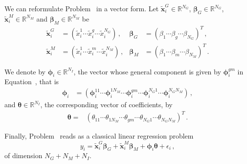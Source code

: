\documentclass[]{book}
\begin{document}
We can reformulate Problem~ in a vector form. Let
\(\tilde{\mathbf{x}}_{i}^{\mathit{G}} \in \mathbb{R}^{N_{\mathit{G}}}\), \(\boldsymbol{\beta}_{\mathit{G}} \in \mathbb{R}^{N_{\mathit{G}}}\),
\(\tilde{\mathbf{x}}_{i}^{\mathit{M}} \in \mathbb{R}^{N_{\mathit{M}}}\) and \(\boldsymbol{\beta}_{\mathit{M}} \in \mathbb{R}^{N_{\mathit{M}}}\)
be \[\begin{aligned}
  \tilde{\mathbf{x}}_{i}^{\mathit{G}} & = (\tilde{x}_i^1 \cdots \tilde{x}_i^g \cdots
                   \tilde{x}_i^{N_{\mathit{G}}})\,,
  &  \boldsymbol{\beta}_{\mathit{G}} & = (\beta_{1} \cdots \beta_{g}
                    \cdots \beta_{N_{\mathit{G}}})^{T}\,,\\
  \tilde{\mathbf{x}}_{i}^{\mathit{M}} & = (\tilde{x}_i^1 \cdots \tilde{x}_i^m \cdots
                   \tilde{x}_i^{N_{\mathit{M}}}) \,,
  & \boldsymbol{\beta}_{\mathit{M}} & = (\beta_{1} \cdots \beta_{m}
                   \cdots \beta_{N_{\mathit{M}}})^{T}\,.\end{aligned}\]

We denote by \(\boldsymbol{\phi}_{i} \in \mathbb{R}^{N_I}\), the vector whose general
component is given by \(\boldsymbol{\phi}^{gm}_i\) in Equation~, that is
\[\begin{aligned}
  \boldsymbol{\phi}_{i} & =  
                       \left(
                       \boldsymbol{\phi}^{11}_i \cdots 
                       \boldsymbol{\phi}^{1N_{\mathit{M}}}_i
                       \cdots
                       \boldsymbol{\phi}^{g m}_i
                       \cdots 
                       \boldsymbol{\phi}^{{N_{\mathit{G}}} 1}_i
                       \cdots
                       \boldsymbol{\phi}^{{N_{\mathit{G}}}  {N_{\mathit{M}}}}_i
                       \right) \,,\end{aligned}\] and
\(\boldsymbol{\theta} \in \mathbb{R}^{N_I}\), the corresponding vector of coefficients, by
\[\begin{aligned}
  \boldsymbol{\theta} = & \left(\theta_{11}   \cdots \theta_{1 
              {N_{\mathit{M}}}}  \cdots \theta_{g m}
              \cdots \theta_{{N_{\mathit{G}}} 1}  \cdots
              \theta_{{N_{\mathit{G}}}  {N_{\mathit{M}}}} \right)^T\,. \end{aligned}\]

Finally, Problem~ reads as a classical linear regression problem
\[\label{eq:compact_vector_model}
  y_i =  \tilde{\mathbf{x}}_{i}^{\mathit{G}} \boldsymbol{\beta}_{\mathit{G}}  + 
  \tilde{\mathbf{x}}_{i}^{\mathit{M}} \boldsymbol{\beta}_{\mathit{M}} + 
  \boldsymbol{\phi}_{i}  \boldsymbol{\theta}  +
  \epsilon_i \,,\] of dimension \(N_{\mathit{G}} + N_{\mathit{M}} + N_I\).
\end{document}

